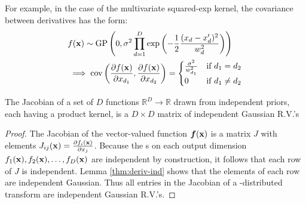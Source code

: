 For example, in the case of the multivariate squared-exp kernel, the covariance between derivatives has the form:
%
\begin{align}
& f({\bf{x}}) \sim \textnormal{GP}\left( 0, 
\sigma^2 \prod_{d=1}^D \exp \left(-\frac{1}{2} \frac{(x_d - x_d')^2}{w_d^2} \right) \right) \nonumber \\
& \implies 
\operatorname{cov} \left( \frac{\partial f({\bf{x}})}{\partial x_{d_1}}, \frac{\partial f({\bf{x}})}{\partial x_{d_2}} \right) =
\begin{cases} 
\frac{\sigma^2}{w_{d_1}^2} & \mbox{if } d_1 = d_2 \\ 
0 & \mbox{if } d_1 \neq d_2 \end{cases}
\end{align}


\begin{lemma}
\label{thm:matrix}
The Jacobian of a set of $D$ functions $\mathbb{R}^D \rightarrow \mathbb{R}$ drawn from independent \gp{} priors, each having a product kernel, is a $D \times D$ matrix of independent Gaussian R.V.'s
\end{lemma}
%
\begin{proof}
The Jacobian of the vector-valued function $\boldsymbol{f}({\bf{x}})$ is a matrix $J$ with elements ${J_{ij}({\bf{x}}) = \frac{ \partial f_i ({\bf{x}}) }{\partial x_j}}$.
%
%
%
Because the \gp{}s on each output dimension $f_1({\bf{x}}), f_2({\bf{x}}), \dots, f_D({\bf{x}})$ are independent by construction, it follows that each row of $J$ is independent.
Lemma \ref{thm:deriv-ind} shows that the elements of each row are independent Gaussian.
Thus all entries in the Jacobian of a \gp{}-distributed transform are independent Gaussian R.V.'s.
\end{proof}



